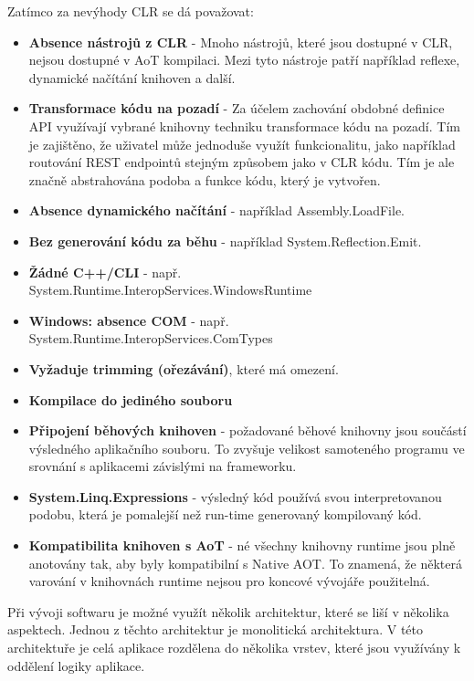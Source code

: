
Zatímco za nevýhody CLR se dá považovat:
\begin{itemize}
    \item  \textbf{Absence nástrojů z CLR} - Mnoho nástrojů, které jsou dostupné v CLR, nejsou dostupné v AoT kompilaci. Mezi tyto nástroje patří například reflexe, dynamické načítání knihoven a další.
    \item \textbf{Transformace kódu na pozadí} - Za účelem zachování obdobné definice API využívají vybrané knihovny techniku transformace kódu na pozadí. Tím je zajištěno, že uživatel může jednoduše využít funkcionalitu, jako například routování REST endpointů stejným způsobem jako v CLR kódu. Tím je ale značně abstrahována podoba a funkce kódu, který je vytvořen.
    \item \textbf{Absence dynamického načítání} - například Assembly.LoadFile.
    \item \textbf{Bez generování kódu za běhu} - například System.Reflection.Emit.
    \item \textbf{Žádné C++/CLI} - např. System.Runtime.InteropServices.WindowsRuntime
    \item \textbf{Windows: absence COM} - např. System.Runtime.InteropServices.ComTypes
    \item \textbf{Vyžaduje trimming (ořezávání)}, které má omezení. 
    \item \textbf{Kompilace do jediného souboru} 
    \item \textbf{Připojení běhových knihoven} - požadované běhové knihovny jsou součástí výsledného aplikačního souboru. To zvyšuje velikost samoteného programu ve srovnání s aplikacemi závislými na frameworku.
    \item \textbf{System.Linq.Expressions} - výsledný kód používá svou interpretovanou podobu, která je pomalejší než run-time generovaný kompilovaný kód.
    \item \textbf{Kompatibilita knihoven s AoT} - né všechny knihovny runtime jsou plně anotovány tak, aby byly kompatibilní s Native AOT. To znamená, že některá varování v knihovnách runtime nejsou pro koncové vývojáře použitelná.
\end{itemize}

Při vývoji softwaru je možné využít několik architektur, které se liší v několika aspektech. Jednou z těchto architektur je monolitická architektura. V této architektuře je celá aplikace rozdělena do několika vrstev, které jsou využívány k oddělení logiky aplikace.

